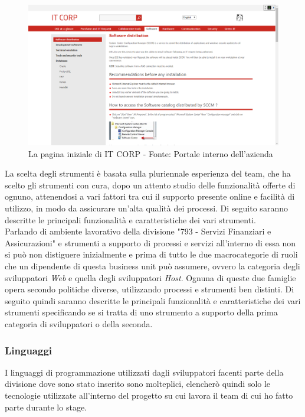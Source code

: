 	\begin{figure}[H]
		\centering
	   	\includegraphics[width=1\textwidth]{immagini/ITCorp}
	   	\caption{La pagina iniziale di IT CORP - Fonte: Portale interno dell'azienda}
	\end{figure}
	
	La scelta degli strumenti è basata sulla pluriennale esperienza del team, che ha scelto gli strumenti con cura, dopo un attento studio delle funzionalità offerte di ognuno, attenendosi a vari fattori tra cui il supporto presente online e facilità di utilizzo, in modo da assicurare un'alta qualità dei processi. Di seguito saranno descritte le principali funzionalità e caratteristiche dei vari strumenti.\\

	Parlando di ambiente lavorativo della divisione "793 - Servizi Finanziari e Assicurazioni" e strumenti a supporto di processi e servizi all'interno di essa non si può non distiguere inizialmente e prima di tutto le due macrocategorie di ruoli che un dipendente di questa business unit può assumere, ovvero la categoria degli sviluppatori \textit{Web} e quella degli sviluppatori \textit{Host}. Ognuna di queste due famiglie opera secondo politiche diverse, utilizzando processi e strumenti ben distinti. Di seguito quindi saranno descritte le principali funzionalità e caratteristiche dei vari strumenti specificando se si tratta di uno strumento a supporto della prima categoria di sviluppatori o della seconda.
	
	\subsubsection{Linguaggi}
	
	I linguaggi di programmazione utilizzati dagli sviluppatori facenti parte della divisione dove sono stato inserito sono molteplici, elencherò quindi solo le tecnologie utilizzate all'interno del progetto su cui lavora il team di cui ho fatto parte durante lo stage.
		
